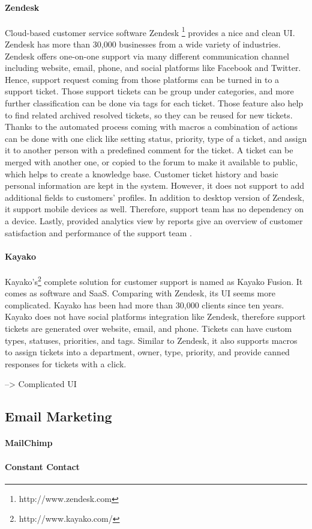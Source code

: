 \paragraph{Zendesk}
Cloud-based customer service software Zendesk \footnote{http://www.zendesk.com} provides a nice and clean \ac{UI}. Zendesk has more than 30,000 businesses from a wide variety of industries. Zendesk offers one-on-one support via many different communication channel including website, email, phone, and social platforms like Facebook and Twitter. Hence, support request coming from those platforms can be turned in to a support ticket. Those support tickets can be group under categories, and more further classification can be done via tags for each ticket. Those feature also help to find related archived resolved tickets, so they can be reused for new tickets. Thanks to the automated process coming with macros a combination of actions can be done with one click like setting status, priority, type of a ticket, and assign it to another person with a predefined comment for the ticket. A ticket can be merged with another one, or copied to the forum to make it available to public, which helps to create a knowledge base. Customer ticket history and basic personal information are kept in the system. However, it does not support to add additional fields to customers' profiles. In addition to desktop version of Zendesk, it support mobile devices as well. Therefore, support team has no dependency on a device. Lastly, provided analytics view by reports give an overview of customer satisfaction and performance of the support team \citep{Zendesk2013,Zendesk2013a}.

\paragraph{Kayako}
Kayako's\footnote{http://www.kayako.com/} complete solution for customer support is named as Kayako Fusion. It comes as software and \ac{SaaS}. Comparing with Zendesk, its \ac{UI} seems more complicated. Kayako has been had more than 30,000 clients since ten years. Kayako does not have social platforms integration like Zendesk, therefore support tickets are generated over website, email, and phone. Tickets can have custom types, statuses, priorities, and tags. Similar to Zendesk, it also supports macros to assign tickets into a department, owner, type, priority, and provide canned responses for tickets with a click.

--> Complicated UI


\subsection{Email Marketing}
\label{subsec:3.1.3:EmaiMarkt}


\paragraph{MailChimp}

\paragraph{Constant Contact}



\begin{comment}
--> At the end, put the all the comparison tables together to the Appendix
--> These features are also helped us to add them into our app, decided by saying they all support so we can also support
\end{comment}
